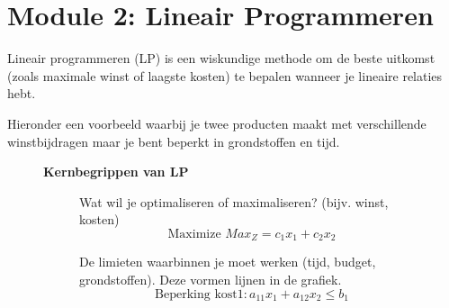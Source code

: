 \documentclass[a4paper,11pt]{article}
\begin{document}
\section{Module 2: Lineair Programmeren}

Lineair programmeren (LP) is een wiskundige methode om de
 beste uitkomst (zoals maximale winst of laagste kosten) te bepalen
wanneer je lineaire relaties hebt.

Hieronder een voorbeeld 
waarbij je twee producten maakt met verschillende winstbijdragen
maar je bent beperkt in grondstoffen en tijd.

\begin{figure}[ht]
    \centering
    \begin{minipage}{0.45\textwidth}
        \textbf{Kernbegrippen van LP}
        \begin{description}
            \item[] Wat wil je 
            optimaliseren of maximaliseren? (bijv. winst, kosten)
            \[\text{Maximize } Max_Z = c_1x_1 + c_2x_2\]
            \item[] De limieten waarbinnen 
            je moet werken (tijd, budget, grondstoffen).
             Deze vormen lijnen in de grafiek. 
             \[\text{Beperking kost} 1: a_{11}x_1 + a_{12}x_2 \leq b_1\]
        \end{description}
    \end{minipage}%
    \hfill
    \begin{minipage}{0.5\textwidth}
        \centering
\end{minipage}
\end{figure}
\end{document}
